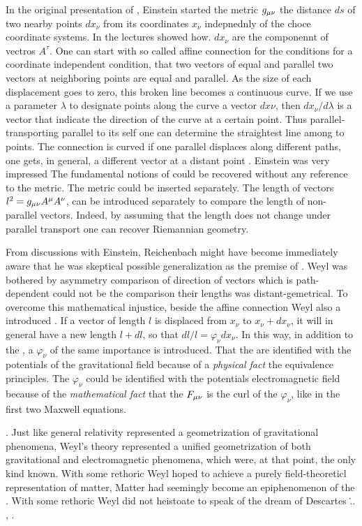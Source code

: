 \documentclass[draft]{article}
\newcommand{\ap}{\ensuremath{\lambda}\xspace}
\newcommand{\phin}{\ensuremath{\varphi_\nu}\xspace}
\begin{document}
In the original presentation of \rt, Einstein started the metric $g_{\mu\nu}$ the distance $ds$ of two nearby points $dx_\nu$ from its coordinates $x_\nu$ indepnednly of the choce coordinate systems. In the lectures showed how. $dx_\nu$ are the componennt of vectros $A^\tau$. One can start with so called affine connection \Gtmn for the conditions for a coordinate independent condition, that two vectors of equal and parallel two vectors at neighboring points are equal and parallel. As the size of each displacement goes to zero, this broken line becomes a continuous curve. If we use a parameter $\ap$ to designate points along the curve a vector $dx\nu$, then $dx_\nu/d\ap$ is a vector that indicate the direction of the curve at a certain point. Thus parallel-transporting parallel to its self one can determine the straightest line among to points. The connection is curved if one parallel displaces along different paths, one gets, in general, a different vector at a distant point \citep[028-01-03, 37]{HR}. Einstein was very impressed The fundamental notions of could be recovered without any reference to the metric. The metric could be inserted separately. The length of vectors $l^2=g_{\mu\nu} A^\mu A^\nu$, can be introduced separately to compare the length of non-parallel vectors. Indeed, by assuming that the length does not change under parallel transport one can recover Riemannian geometry.  


From discussions with Einstein, Reichenbach might have become immediately aware that he was skeptical possible generalization as the premise of \uftp. Weyl was bothered by asymmetry comparison of direction of vectors which is path-dependent could not be the comparison their lengths was distant-gemetrical. To overcome this mathematical injustice, beside the affine connection Weyl also a introduced . If a vector of length $l$ is displaced from $x_\nu$ to $x_\nu+dx_\nu$, it will in general have a new length $l+dl$, so that $dl/l=\phin dx_\nu$. In this way, in addition to the  \gmn, a  $\phin$ of the same importance is introduced. That the \gmn are identified with the potentials of the gravitational field because of a \emph{physical fact} the equivalence principles. The \phin could be identified with the potentials electromagnetic field  because of the \emph{mathematical fact} that the $F_{\mu\nu}$ is the curl of the \phin, like in the first two Maxwell equations. 

. Just like general relativity represented a geometrization of gravitational phenomena, Weyl's theory represented a unified geometrization of both gravitational and electromagnetic phenomena, which were, at that point, the only kind known. With some rethoric Weyl hoped to achieve a purely field-theoreticl representation of matter, Matter had seemingly become an epiphenomenon of the . With some rethoric Weyl did not heistoate to speak of the dream of Descartes \... ,   \citep{Weyl1919}. 
\end{document}

